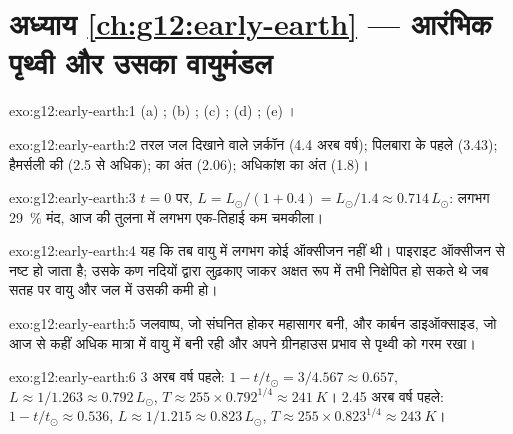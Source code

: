 \section*{अध्याय \ref{ch:g12:early-earth} --- आरंभिक पृथ्वी और उसका वायुमंडल}

\begin{solution}{exo:g12:early-earth:1}
(a) ; (b) ; (c) ; (d) ; (e) ।
\end{solution}

\begin{solution}{exo:g12:early-earth:2}
तरल जल दिखाने वाले ज़र्कॉन (4.4 अरब वर्ष); पिलबारा के पहले 
(3.43); हैमर्सली की  (2.5 से
अधिक);  का अंत (2.06); अधिकांश  का अंत (1.8)।
\end{solution}

\begin{solution}{exo:g12:early-earth:3}
$t = 0$ पर, $L = L_\odot/(1 + 0.4) = L_\odot/1.4 \approx 0.714\,L_\odot$:
लगभग \qty{29}{\percent} मंद, आज की तुलना में लगभग एक-तिहाई कम चमकीला।
\end{solution}

\begin{solution}{exo:g12:early-earth:4}
यह कि तब वायु में लगभग कोई ऑक्सीजन नहीं थी। पाइराइट ऑक्सीजन से नष्ट हो जाता है;
उसके कण नदियों द्वारा लुढ़काए जाकर अक्षत रूप में तभी निक्षेपित हो सकते थे जब
सतह पर वायु और जल में उसकी कमी हो।
\end{solution}

\begin{solution}{exo:g12:early-earth:5}
जलवाष्प, जो संघनित होकर महासागर बनी, और कार्बन डाइऑक्साइड, जो
आज से कहीं अधिक मात्रा में वायु में बनी रही और अपने ग्रीनहाउस प्रभाव से पृथ्वी को
गरम रखा।
\end{solution}

\begin{solution}{exo:g12:early-earth:6}
3 अरब वर्ष पहले: $1 - t/t_\odot = 3/4.567 \approx 0.657$, $L \approx
1/1.263 \approx 0.792\,L_\odot$, $T \approx 255 \times 0.792^{1/4} \approx
\qty{241}{K}$। 2.45 अरब वर्ष पहले: $1 - t/t_\odot \approx 0.536$, $L
\approx 1/1.215 \approx 0.823\,L_\odot$, $T \approx 255 \times 0.823^{1/4}
\approx \qty{243}{K}$।
\end{solution}

